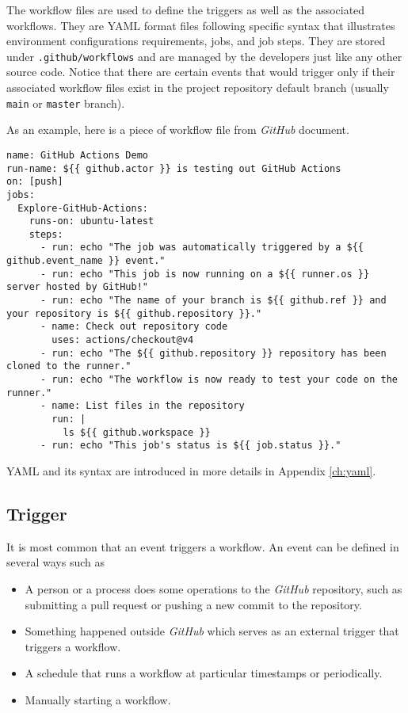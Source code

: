 The workflow files are used to define the triggers as well as the associated workflows. They are YAML format files following specific syntax that illustrates environment configurations requirements, jobs, and job steps. They are stored under \verb|.github/workflows| and are managed by the developers just like any other source code. Notice that there are certain events that would trigger only if their associated workflow files exist in the project repository default branch (usually \verb|main| or \verb|master| branch).

As an example, here is a piece of workflow file from \textit{GitHub} document. \label{code:githubactionsdemo}
\begin{lstlisting}
name: GitHub Actions Demo
run-name: ${{ github.actor }} is testing out GitHub Actions
on: [push]
jobs:
  Explore-GitHub-Actions:
    runs-on: ubuntu-latest
    steps:
      - run: echo "The job was automatically triggered by a ${{ github.event_name }} event."
      - run: echo "This job is now running on a ${{ runner.os }} server hosted by GitHub!"
      - run: echo "The name of your branch is ${{ github.ref }} and your repository is ${{ github.repository }}."
      - name: Check out repository code
        uses: actions/checkout@v4
      - run: echo "The ${{ github.repository }} repository has been cloned to the runner."
      - run: echo "The workflow is now ready to test your code on the runner."
      - name: List files in the repository
        run: |
          ls ${{ github.workspace }}
      - run: echo "This job's status is ${{ job.status }}."
\end{lstlisting}

YAML and its syntax are introduced in more details in Appendix \ref{ch:yaml}.

\subsection{Trigger}

It is most common that an event triggers a workflow. An event can be defined in several ways such as
\begin{itemize}
	\item A person or a process does some operations to the \textit{GitHub} repository, such as submitting a pull request or pushing a new commit to the repository.
	\item Something happened outside \textit{GitHub} which serves as an external trigger that triggers a workflow.
	\item A schedule that runs a workflow at particular timestamps or periodically.
	\item Manually starting a workflow.
\end{itemize}


